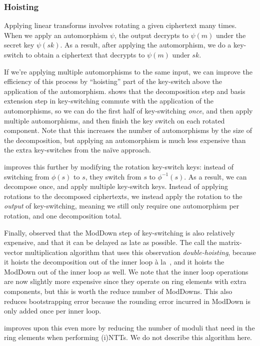 \documentclass[../fheimpl.tex]{subfiles}
\begin{document}
    \subsubsection{Hoisting}
    \label{sec:hoisting}
    Applying linear transforms involves rotating a given ciphertext many times. When we apply an automorphism $\psi$, the output decrypts to $\psi(m)$ under the secret key $\psi(sk)$. As a result, after applying the automorphism, we do a key-switch to obtain a ciphertext that decrypts to $\psi(m)$ under $sk$. 
	
	If we're applying multiple automorphisms to the same input, we can improve the efficiency of this process by ``hoisting'' part of the key-switch above the application of the automorphism. \cite{cryptoeprint:2018/244} shows that the decomposition step and basis extension step in key-switching commute with the application of the automorphisms, so we can do the first half of key-switching \emph{once}, and then apply multiple automorphisms, and then finish the key switch on each rotated component. Note that this increases the number of automorphisms by the size of the decomposition, but applying an automorphism is much less expensive than the extra key-switches from the na\"ive approach.
	
	\cite{cryptoeprint:2020/1203} improves this further by modifying the rotation key-switch keys: instead of switching from $\phi(s)$ to $s$, they switch from $s$ to $\phi^{-1}(s)$. As a result, we can decompose once, and apply multiple key-switch keys. Instead of applying rotations to the decomposed ciphertexts, we instead apply the rotation to the \emph{output} of key-switching, meaning we still only require one automorphism per rotation, and one decomposition total.
	
	Finally, \cite{cryptoeprint:2020/1203} observed that the ModDown step of key-switching is also relatively expensive, and that it can be delayed as late as possible. The call the matrix-vector multiplication algorithm that uses this observation \emph{double-hoisting}, because it hoists the decomposition out of the inner loop \`{a} la~\cite{cryptoeprint:2018/244}, and it hoists the ModDown out of the inner loop as well. We note that the inner loop operations are now slightly more expensive since they operate on ring elements with extra components, but this is worth the reduce number of ModDowns. This also reduces bootstrapping error because the rounding error incurred in ModDown is only added once per inner loop.

    \cite{cryptoeprint:2025/429} improves upon this even more by reducing the number of moduli that need in the ring elements when performing (i)NTTs. We do not describe this algorithm here.
	
\end{document}
